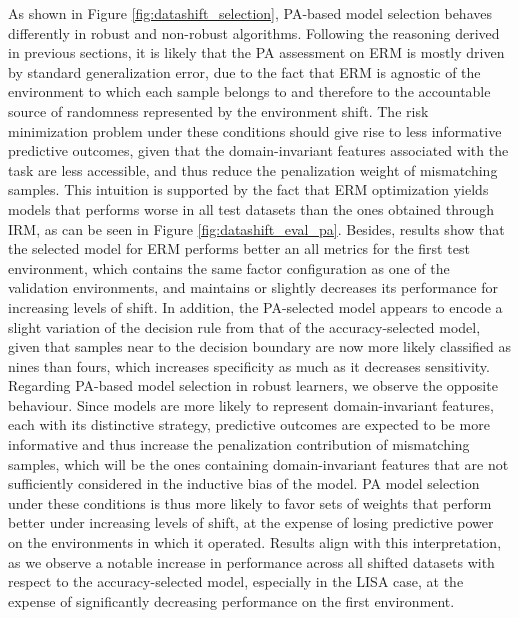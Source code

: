 As shown in Figure \ref{fig:datashift_selection}, PA-based model selection behaves differently in robust
and non-robust algorithms. Following the reasoning derived in previous sections, it is likely that the PA
assessment on ERM is mostly driven by standard generalization error, due to the fact that ERM is agnostic
of the environment to which each sample belongs to and therefore to the accountable source of randomness represented
by the environment shift. The risk minimization problem under these conditions should give rise to less informative
predictive outcomes, given that the domain-invariant features associated with the task are less accessible, and
thus reduce the penalization weight of mismatching samples. This intuition is supported by the fact that ERM
optimization yields models that performs worse in all test datasets than the ones obtained through IRM,
as can be seen in Figure \ref{fig:datashift_eval_pa}. Besides, results show that the selected model for ERM 
performs better an all metrics for the first test environment, which contains
the same factor configuration as one of the validation environments, and maintains or slightly decreases its performance
for increasing levels of shift. In addition, the PA-selected model appears to encode a slight variation of the 
decision rule from that of the accuracy-selected model, given that samples near to the decision boundary are now
more likely classified as nines than fours, which increases specificity as much as it decreases sensitivity. \\

Regarding PA-based model selection in robust learners, we observe the opposite behaviour. Since models are more likely
to represent domain-invariant features, each with its distinctive strategy, predictive outcomes are expected to
be more informative and thus increase the penalization contribution of mismatching samples, which will be the ones
containing domain-invariant features that are not sufficiently considered in the inductive bias of the model. PA
model selection under these conditions is thus more likely to favor sets of weights that perform better under
increasing levels of shift, at the expense of losing predictive power on the environments in which it operated. 
Results align with this interpretation, as we observe a notable increase in performance across all shifted datasets
with respect to the accuracy-selected model, especially in the LISA case, at the expense of significantly decreasing
performance on the first environment.\\


